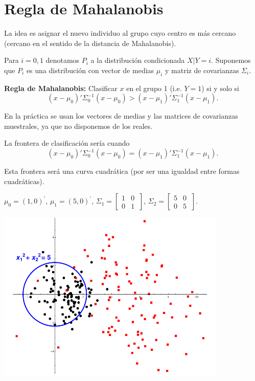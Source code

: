 \section{Regla de Mahalanobis}

La idea es asignar el nuevo individuo al grupo cuyo centro es más cercano (cercano en el sentido de la distancia de Mahalanobis).


\begin{defn}
Para $i=0,1$ denotamos $P_i$  a la distribución condicionada  $X|Y=i$. Suponemos que $P_i$ es una distribución con vector de medias $\mu_i$ y matriz de covarianzas $\Sigma_i$.


\textbf{Regla de Mahalanobis:} Clasificar $x$ en el grupo 1 (i.e. $Y=1$) si y solo si
\[
(x-\mu_0)'\Sigma_0^{-1}(x-\mu_0) >  (x-\mu_1)'\Sigma_1^{-1}(x-\mu_1).
\]
\end{defn}
En la práctica se usan los vectores de medias y las matrices de covarianzas muestrales, ya que no disponemos de los reales.

La frontera de clasificación sería cuando 
\[
(x-\mu_0)'\Sigma_0^{-1}(x-\mu_0) =  (x-\mu_1)'\Sigma_1^{-1}(x-\mu_1).
\]

Esta frontera será una curva cuadrática (por ser una igualdad entre formas cuadráticas). 

\begin{example}


\centerline{$\mu_0=(1,0)^\prime$, $\mu_1=
(5,0)^\prime$, $\Sigma_1=\left[
  \begin{array}{cc}
    1 & 0 \\
    0 & 1 \
  \end{array} \right]$,
$\Sigma_2=\left[
  \begin{array}{cc}
    5 & 0 \\
    0 & 5 \
  \end{array} \right]$.}

\begin{center}
\includegraphics[width=11cm]{img/ReglaMahalanobis.png}
\end{center}

\end{example}

